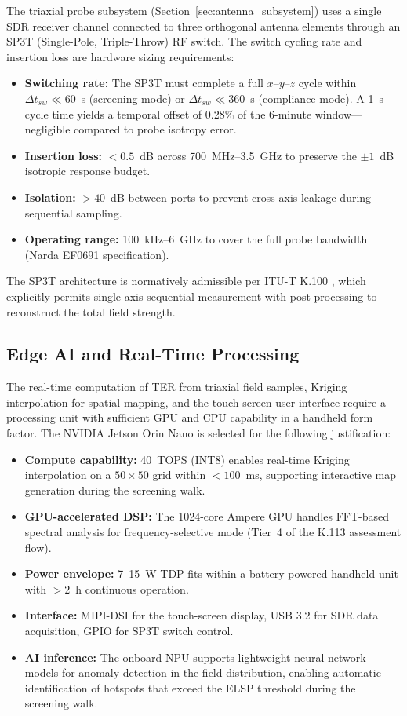 \documentclass[11pt,a4paper]{article}
\begin{document}
The triaxial probe subsystem (Section~\ref{sec:antenna_subsystem}) uses a single SDR receiver channel connected to three orthogonal antenna elements through an SP3T (Single-Pole, Triple-Throw) RF switch. The switch cycling rate and insertion loss are hardware sizing requirements:

\begin{itemize}
    \item \textbf{Switching rate:} The SP3T must complete a full $x$--$y$--$z$ cycle within $\Delta t_{sw} \ll 60$~s (screening mode) or $\Delta t_{sw} \ll 360$~s (compliance mode). A 1~s cycle time yields a temporal offset of 0.28\% of the 6-minute window---negligible compared to probe isotropy error.
    \item \textbf{Insertion loss:} $< 0.5$~dB across 700~MHz--3.5~GHz to preserve the $\pm 1$~dB isotropic response budget.
    \item \textbf{Isolation:} $> 40$~dB between ports to prevent cross-axis leakage during sequential sampling.
    \item \textbf{Operating range:} 100~kHz--6~GHz to cover the full probe bandwidth (Narda EF0691 specification).
\end{itemize}

\noindent The SP3T architecture is normatively admissible per ITU-T K.100 \cite{itut_k100}, which explicitly permits single-axis sequential measurement with post-processing to reconstruct the total field strength.

\subsection{Edge AI and Real-Time Processing}

The real-time computation of TER from triaxial field samples, Kriging interpolation for spatial mapping, and the touch-screen user interface require a processing unit with sufficient GPU and CPU capability in a handheld form factor. The NVIDIA Jetson Orin Nano \cite{jetson_orin} is selected for the following justification:

\begin{itemize}
    \item \textbf{Compute capability:} 40~TOPS (INT8) enables real-time Kriging interpolation on a $50 \times 50$ grid within $< 100$~ms, supporting interactive map generation during the screening walk.
    \item \textbf{GPU-accelerated DSP:} The 1024-core Ampere GPU handles FFT-based spectral analysis for frequency-selective mode (Tier~4 of the K.113 assessment flow).
    \item \textbf{Power envelope:} 7--15~W TDP fits within a battery-powered handheld unit with $> 2$~h continuous operation.
    \item \textbf{Interface:} MIPI-DSI for the touch-screen display, USB 3.2 for SDR data acquisition, GPIO for SP3T switch control.
    \item \textbf{AI inference:} The onboard NPU supports lightweight neural-network models for anomaly detection in the field distribution, enabling automatic identification of hotspots that exceed the ELSP threshold during the screening walk.
\end{itemize}
\end{document}
